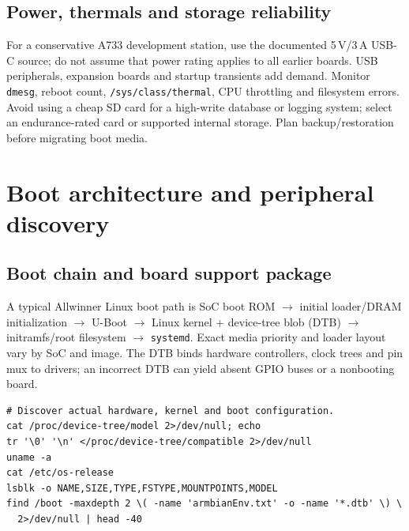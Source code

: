 \documentclass[10pt,oneside,openany]{report}
\newcommand{\code}[1]{\texttt{#1}}
\begin{document}
\section{Power, thermals and storage reliability}
For a conservative A733 development station, use the documented 5\,V/3\,A USB-C source; do not assume that power rating applies to all earlier boards. USB peripherals, expansion boards and startup transients add demand. Monitor \code{dmesg}, reboot count, \code{/sys/class/thermal}, CPU throttling and filesystem errors. Avoid using a cheap SD card for a high-write database or logging system; select an endurance-rated card or supported internal storage. Plan backup/restoration before migrating boot media.

\chapter{Boot architecture and peripheral discovery}
\section{Boot chain and board support package}
A typical Allwinner Linux boot path is SoC boot ROM \(\rightarrow\) initial loader/DRAM initialization \(\rightarrow\) U-Boot \(\rightarrow\) Linux kernel + device-tree blob (DTB) \(\rightarrow\) initramfs/root filesystem \(\rightarrow\) \code{systemd}. Exact media priority and loader layout vary by SoC and image. The DTB binds hardware controllers, clock trees and pin mux to drivers; an incorrect DTB can yield absent GPIO buses or a nonbooting board.
\begin{lstlisting}[style=sh]
# Discover actual hardware, kernel and boot configuration.
cat /proc/device-tree/model 2>/dev/null; echo
tr '\0' '\n' </proc/device-tree/compatible 2>/dev/null
uname -a
cat /etc/os-release
lsblk -o NAME,SIZE,TYPE,FSTYPE,MOUNTPOINTS,MODEL
find /boot -maxdepth 2 \( -name 'armbianEnv.txt' -o -name '*.dtb' \) \
  2>/dev/null | head -40
\end{lstlisting}
\end{document}
